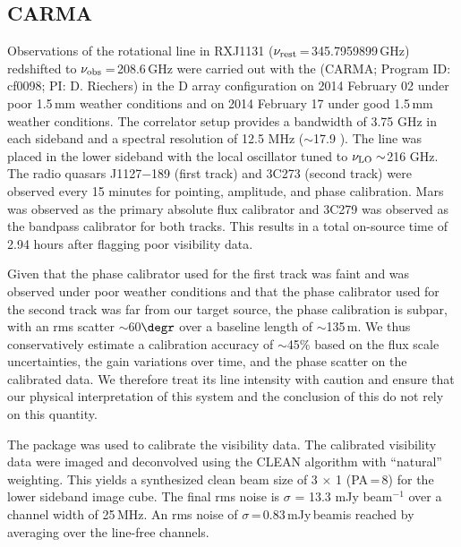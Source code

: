\documentclass[]{emulateapj}
\begin{document}
\subsection{CARMA \cco}
Observations of the \cco rotational line in RXJ1131
($\nu_{\rm rest}$\,=\,345.7959899\,GHz) redshifted to $\nu_{\rm obs}$\,=\,208.6\,GHz
were carried out with the \carma (CARMA;
Program ID: cf0098; PI: D. Riechers)
in the D array configuration on 2014 February 02 under poor 1.5\,mm
weather conditions and on 2014 February 17 under good 1.5\,mm
weather conditions. The correlator setup provides a bandwidth of 3.75 GHz in
each sideband and a spectral resolution of 12.5 MHz ($\sim$17.9 \kms). The
line was placed in the lower sideband with the local oscillator tuned to $\nu_{\rm LO}\sim$216 GHz. The radio quasars J1127$-$189 (first track) and 3C273
(second track) were observed
every 15 minutes for pointing, amplitude, and phase calibration. Mars was
observed as the primary absolute flux calibrator and 3C279 was observed as
the bandpass calibrator for both tracks. This results in a total on-source time of 2.94 hours after flagging poor
visibility data.

%
%
Given that the phase calibrator used for the first track was faint and was
observed under poor weather conditions and that the phase calibrator used for
the second track was far from our target source, the phase calibration is
subpar, with an rms scatter $\sim$60$\degr$ over a baseline length of $\sim$135\,m.
We thus conservatively estimate
a calibration accuracy of $\sim$45\% based on the flux scale uncertainties,
the gain variations over time, and the phase scatter on the calibrated data. We
therefore treat its line intensity with caution and ensure that our physical interpretation
of this system and the conclusion of this do not rely on this quantity.

The  package was used to calibrate the visibility data.
The calibrated visibility data were
imaged and deconvolved using the CLEAN algorithm with ``natural'' weighting. This yields a synthesized clean
beam size of 3 $\times$ 1 (PA\,=\,8\degr) for the lower sideband
image cube. The final rms noise is $\sigma$ = 13.3 mJy beam$^{-1}$
over a channel width of 25\,MHz. An rms noise of
$\sigma$\,=\,0.83\,mJy\,beam\pmOne is reached by averaging over the
line-free channels.
\end{document}

